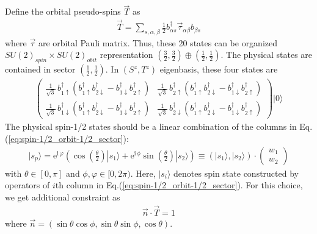 \documentclass[%
 reprint,
 amsmath,amssymb,
 aps,
 pra, %
]{revtex4-1}
\newcommand{\ee}{\mathrm{e}}
\newcommand{\ii}{\mathrm{i}\,}
\newcommand{\dg}{\dagger}
\begin{document}
Define the orbital pseudo-spins $\vec{T}$ as
\begin{align}
  \vec{T}=\sum_{s,\alpha,\beta}\frac{1}{2}b_{\alpha s}^\dg\vec{\tau}_{\alpha\beta}b_{\beta s}
  \label{}
\end{align}
where $\vec{\tau}$ are orbital Pauli matrix. Thus, these 20 states can be organized $SU(2)_{spin}\times SU(2)_{obit}$ representation $\left( \frac{3}{2},\frac{3}{2} \right)\oplus\left( \frac{1}{2},\frac{1}{2} \right)$. The physical states are contained in sector $\left( \frac{1}{2},\frac{1}{2} \right)$. In $(S^z,T^z)$ eigenbasis, these four states are
\begin{align}
  \begin{pmatrix}
  \frac{1}{\sqrt{3}}\,b_{1\uparrow}^\dg\left( b_{1\uparrow}^\dg b_{2\downarrow}^\dg-b_{1\downarrow}^\dg b_{2\uparrow}^\dg \right) & 
  \frac{1}{\sqrt{3}}\,b_{2\uparrow}^\dg\left( b_{1\uparrow}^\dg b_{2\downarrow}^\dg-b_{1\downarrow}^\dg b_{2\uparrow}^\dg \right) \\[0.4cm]
  \frac{1}{\sqrt{3}}\,b_{1\downarrow}^\dg\left( b_{1\uparrow}^\dg b_{2\downarrow}^\dg-b_{1\downarrow}^\dg b_{2\uparrow}^\dg \right) & 
  \frac{1}{\sqrt{3}}\,b_{2\downarrow}^\dg\left( b_{1\uparrow}^\dg b_{2\downarrow}^\dg-b_{1\downarrow}^\dg b_{2\uparrow}^\dg \right) 
  \end{pmatrix}
  |0\rangle
  \label{eq:spin-1/2_orbit-1/2_sector}
\end{align}
The physical spin-1/2 states should be a linear combination of the columns in Eq.(\ref{eq:spin-1/2_orbit-1/2_sector}):
\begin{align}
  |s_p\rangle=\ee^{\ii\varphi}\left(\cos\left( \frac{\theta}{2} \right)|s_1\rangle+\ee^{\ii\phi}\sin\left( \frac{\theta}{2} \right)|s_2\rangle \right)
  \equiv (|s_1\rangle, |s_2\rangle) \cdot \begin{pmatrix}w_1\\w_2\end{pmatrix} \label{}
\end{align}
with $\theta\in[0,\pi]$ and $\phi,\varphi\in[0,2\pi)$. Here, $|s_i\rangle$ denotes spin state constructed by operators of $i$th column in Eq.(\ref{eq:spin-1/2_orbit-1/2_sector}). For this choice, we get additional constraint as
\begin{align}
  \vec{n}\cdot\vec{T}=1
  \label{}
\end{align}
where $\vec{n}=\left( \sin\theta\cos\phi,\sin\theta\sin\phi,\cos\theta \right)$.
\end{document}
